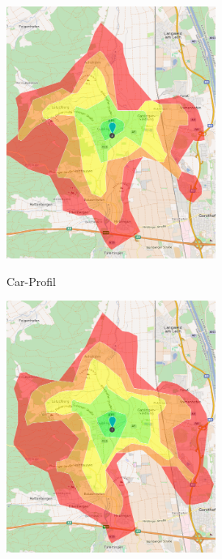 \documentclass[12pt,a4paper]{article}
\begin{document}
\begin{figure}[h]
\begin{subfigure}{0.49\textwidth}
\includegraphics[width = 0.75\textwidth]{../media/isocar.png} \\
\caption{Car-Profil}
\label{fig:isocar}
\end{subfigure}
\begin{subfigure}{0.49\textwidth}
\centering
\includegraphics[width = 0.75\textwidth]{../media/isofire.png} \\

\end{subfigure}
\end{figure}
\end{document}
